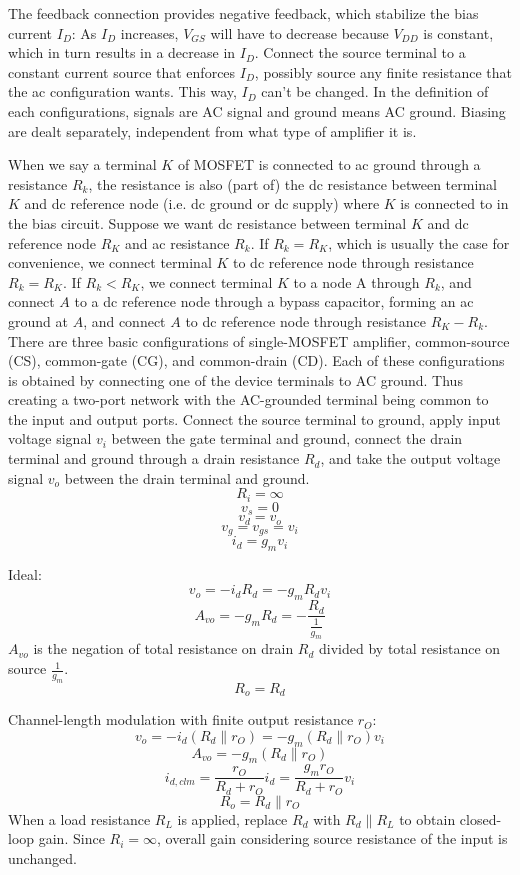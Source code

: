 \documentclass[a4paper,12pt]{report}
\begin{document}
The feedback connection provides negative feedback, which stabilize the bias current $I_D$: As $I_D$ increases, $V_{GS}$ will have to decrease because $V_{DD}$ is constant, which in turn results in a decrease in $I_D$.
Connect the source terminal to a constant current source that enforces $I_D$, possibly source any finite resistance that the ac configuration wants. This way, $I_D$ can't be changed.
In the definition of each configurations, signals are AC signal and ground means AC ground. Biasing are dealt separately, independent from what type of amplifier it is.

When we say a terminal $K$ of MOSFET is connected to ac ground through a resistance $R_k$, the resistance is also (part of) the dc resistance between terminal $K$ and dc reference node (i.e. dc ground or dc supply) where $K$ is connected to in the bias circuit. Suppose we want dc resistance between terminal $K$ and dc reference node $R_K$ and ac resistance $R_k$. If $R_k=R_K$, which is usually the case for convenience, we connect terminal $K$ to dc reference node through resistance $R_k=R_K$. If $R_k<R_K$, we connect terminal $K$ to a node A through $R_k$, and connect $A$ to a dc reference node through a bypass capacitor, forming an ac ground at $A$, and connect $A$ to dc reference node through resistance $R_K-R_k$.
There are three basic configurations of single-MOSFET amplifier, common-source (CS), common-gate (CG), and common-drain (CD). Each of these configurations is obtained by connecting one of the device terminals to AC ground. Thus creating a two-port network with the AC-grounded terminal being common to the input and output ports.
Connect the source terminal to ground, apply input voltage signal $v_i$ between the gate terminal and ground, connect the drain terminal and ground through a drain resistance $R_d$, and take the output voltage signal $v_o$ between the drain terminal and ground.
\[R_i=\infty\]
\[v_s=0\]
\[v_d=v_o\]
\[v_g=v_{gs}=v_i\]
\[i_d=g_mv_i\]
\bit
\item Ideal:
\[v_o=-i_dR_d=-g_mR_dv_i\]
\[A_{vo}=-g_mR_d=-\frac{R_d}{\frac{1}{g_m}}\]
$A_{vo}$ is the negation of total resistance on drain $R_d$ divided by total resistance on source $\frac{1}{g_m}$. 
\[R_o=R_d\]
\item Channel-length modulation with finite output resistance $r_O$:
\[v_o=-i_d(R_d\parallel r_O)=-g_m(R_d\parallel r_O)v_i\]
\[A_{vo}=-g_m(R_d\parallel r_O)\]
\[i_{d,clm}=\frac{r_O}{R_d+r_O}i_d=\frac{g_mr_O}{R_d+r_O}v_i\]
\[R_o=R_d\parallel r_O\]
\eit
When a load resistance $R_L$ is applied, replace $R_d$ with $R_d\parallel R_L$ to obtain closed-loop gain. Since $R_i=\infty$, overall gain considering source resistance of the input is unchanged.
\end{document}
